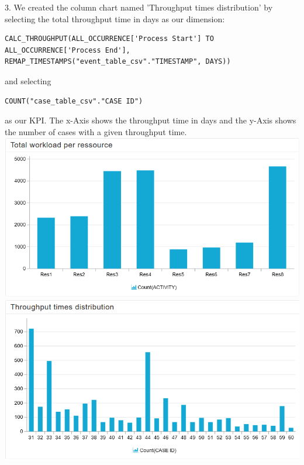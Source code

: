 \documentclass[../../main.tex]{subfiles}
\begin{document}
3. We created the column chart named 'Throughput times distribution' by selecting the total throughput time in days as our dimension:
\begin{verbatim}
CALC_THROUGHPUT(ALL_OCCURRENCE['Process Start'] TO ALL_OCCURRENCE['Process End'], REMAP_TIMESTAMPS("event_table_csv"."TIMESTAMP", DAYS))
\end{verbatim} 
and selecting 
\begin{verbatim}
COUNT("case_table_csv"."CASE ID")
\end{verbatim}
as our KPI. The x-Axis shows the throughput time in days and the y-Axis shows the number of cases with a given throughput time.\\
\includegraphics[width=0.5\columnwidth]{img/Celonis_d_workload.png}
\includegraphics[width=0.5\columnwidth]{img/Celonis_d_throughput_times.png}\\
\end{document}
